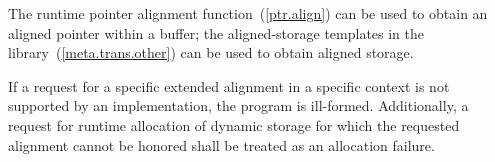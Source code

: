 \pnum
\enternote The runtime pointer alignment function~(\ref{ptr.align})
can be used to obtain an aligned pointer within a buffer; the aligned-storage templates
in the library~(\ref{meta.trans.other}) can be used to obtain aligned storage.
\exitnote

\pnum
If a request for a specific extended alignment in a specific context is not
supported by an implementation, the program is ill-formed. Additionally, a
request for runtime allocation of dynamic storage for which the requested
alignment cannot be honored shall be treated as an allocation failure.
